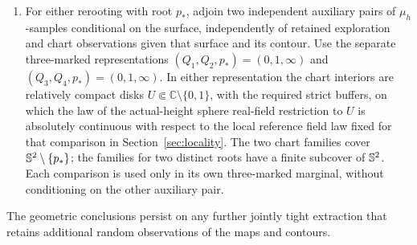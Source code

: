 \begin{proposition}
\begin{enumerate}[label=\textup{(\roman*)}]
For each member \(K\Subset U\) of a fixed finite family, protection
chooses a finite union \(I\) of tour intervals with
\[
 (\eta^{\mathrm{ref}})^{-1}(K)\subset I
 \Subset(\eta^{\mathrm{ref}})^{-1}(U).
\]
Eventually \(I\) contains every tour representative of each flag
whose contour projection meets \(K\) and of the full incidence stars
of its three vertices.  Intervals are interpreted on the time circle
for a sphere and are bounded in the bilateral case.  In a protected
bilateral window the finite sewing leaves these stars unchanged,
including cyclic order and original primal incidences.  The
homeomorphism of this protected bilateral sewing has projection error
tending to zero over the tests, and its full inverse image of \(K\)
lies in the unchanged part.  The eventual index may depend on the
tests and the sample.

\item For either rerooting with root \(p_*\), adjoin two independent
auxiliary pairs of \(\mu_h\)-samples conditional on the surface,
independently of retained exploration and chart observations given
that surface and its contour.  Use the separate three-marked
representations
\((Q_1,Q_2,p_*)=(0,1,\infty)\) and
\((Q_3,Q_4,p_*)=(0,1,\infty)\).
In either representation the chart interiors are relatively compact
disks \(U\Subset\mathbb C\setminus\{0,1\}\), with the required
strict buffers, on which the law of the actual-height sphere
real-field restriction to \(U\) is absolutely continuous with
respect to the local reference field law fixed for that comparison
in Section~\ref{sec:locality}.  The two chart families cover
\(\mathbb S^2\setminus\{p_*\}\); the families for two distinct roots have
a finite subcover of \(\mathbb S^2\).  Each comparison is used only in its
own three-marked marginal, without conditioning on the other auxiliary pair.
\end{enumerate}
The geometric conclusions persist on any further jointly tight extraction
that retains additional random observations of the maps and contours.
\end{proposition}

